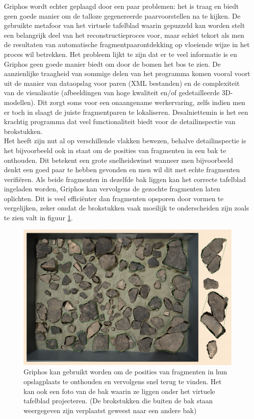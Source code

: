 Griphos wordt echter geplaagd door een paar problemen: het is traag en biedt geen goede manier om de talloze gegenereerde paarvoorstellen na te kijken. De gebruikte metafoor van het virtuele tafelblad waarin gepuzzeld kan worden stelt een belangrijk deel van het reconstructieproces voor, maar schiet tekort als men de resultaten van automatische fragmentpaarontdekking op vloeiende wijze in het proces wil betrekken. Het probleem lijkt te zijn dat er te veel informatie is en Griphos geen goede manier biedt om door de bomen het bos te zien. De aanzienlijke traagheid van sommige delen van het programma komen vooral voort uit de manier van dataopslag voor paren (XML bestanden) en de complexiteit van de visualisatie (afbeeldingen van hoge kwaliteit en/of gedetailleerde 3D-modellen). Dit zorgt soms voor een onaangename werkervaring, zelfs indien men er toch in slaagt de juiste fragmentparen te lokaliseren. Desalniettemin is het een krachtig programma dat veel functionaliteit biedt voor de detailinspectie van brokstukken.\\

Het heeft zijn nut al op verschillende vlakken bewezen, behalve detailinspectie is het bijvoorbeeld ook in staat om de posities van fragmenten in een bak te onthouden. Dit betekent een grote snelheidswinst wanneer men bijvoorbeeld denkt een goed paar te hebben gevonden en men wil dit met echte fragmenten verifi\"eren. Als beide fragmenten in dezelfde bak liggen kan het correcte tafelblad ingeladen worden, Griphos kan vervolgens de gezochte fragmenten laten oplichten. Dit is veel effici\"enter dan fragmenten opsporen door vormen te vergelijken, zeker omdat de brokstukken vaak moeilijk te onderscheiden zijn zoals te zien valt in figuur \ref{fig:griphosbak}. 

\begin{figure}[ht]
	\begin{center}
		\includegraphics[width=.8\columnwidth]{images/griphos-bak-01.png}
		\caption{Griphos kan gebruikt worden om de posities van fragmenten in hun opslagplaats te onthouden en vervolgens snel terug te vinden. Het kan ook een foto van de bak waarin ze liggen onder het virtuele tafelblad projecteren. (De brokstukken die buiten de bak staan weergegeven zijn verplaatst geweest naar een andere bak)}
		\label{fig:griphosbak}
	\end{center}
\end{figure}

